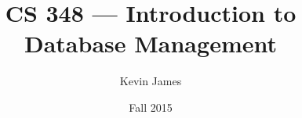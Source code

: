 \documentclass[12pt]{article}
\begin{document}
\title{CS 348 --- Introduction to Database Management}
\author{Kevin James}
\date{\vspace{-2ex}Fall 2015}
\maketitle\HRule

\tableofcontents
\newpage
\end{document}
